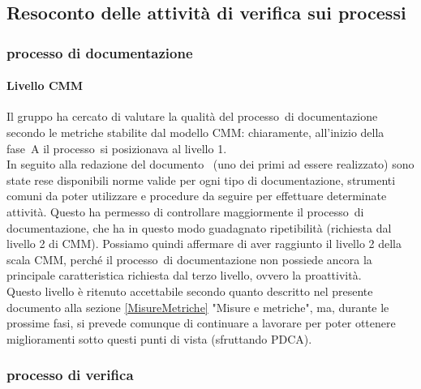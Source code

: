 \documentclass[../PianoDiQualifica.tex]{subfiles}
\begin{document}
\begin{appendices}
	\subsection{Resoconto delle attività di verifica sui processi}
		\subsubsection{processo di documentazione}
			\paragraph{Livello CMM}
			Il gruppo ha cercato di valutare la qualità del processo\g\ di documentazione secondo le metriche stabilite dal modello CMM\g: chiaramente, all'inizio della fase\g\ A il processo\g\ si posizionava al livello 1.\\
			In seguito alla redazione del documento \normediprogetto\ (uno dei primi ad essere realizzato) sono state rese disponibili norme valide per ogni tipo di documentazione, strumenti comuni da poter utilizzare e procedure da seguire per effettuare determinate attività. Questo ha permesso di controllare maggiormente il processo\g\ di documentazione, che ha in questo modo guadagnato ripetibilità (richiesta dal livello 2 di CMM\g).
			Possiamo quindi affermare di aver raggiunto il livello 2 della scala CMM\g, perché il processo\g\ di documentazione non possiede ancora la principale caratteristica richiesta dal terzo livello, ovvero la proattività.\\
			Questo livello è ritenuto accettabile secondo quanto descritto nel presente documento alla sezione \ref{MisureMetriche} "Misure e metriche", ma, durante le prossime fasi, si prevede comunque di continuare a lavorare per poter ottenere miglioramenti sotto questi punti di vista (sfruttando PDCA\g).
		\subsubsection{processo di verifica}

\end{appendices}
\end{document}
